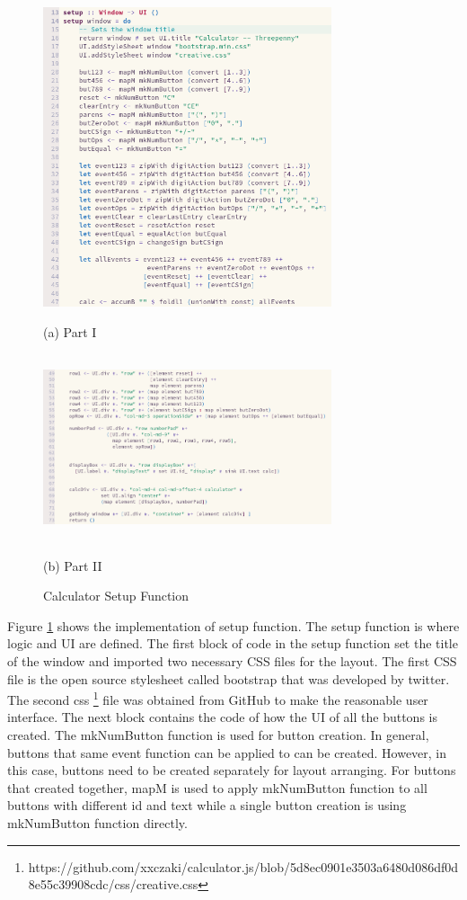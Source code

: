 \documentclass{article}
\begin{document}
\begin{normalsize}
\begin{figure}[H]
    \begin{minipage}[b]{0.48\linewidth}
      \centering
      \centerline{\includegraphics[width=8.5cm]{calcsetup1}}
      \centerline{ (a) Part I}\medskip
    \end{minipage}
    \hfill
    \begin{minipage}[b]{0.48\linewidth}
      \centering
      \centerline{\includegraphics[width=8.5cm,height=5.5cm]{calcsetup2}}
      \centerline{ (b) Part II }\medskip
    \end{minipage}
    \caption{Calculator Setup Function}
    \label{fig:calcsetup}
  \end{figure}

  Figure \ref{fig:calcsetup} shows the implementation of setup function.
  The setup function is where logic and UI are defined. The first block of code in the setup function set the title of the window and imported two necessary CSS files for the layout. The first CSS file is the open source stylesheet called bootstrap that was developed by twitter. The second css \footnote[1]{https://github.com/xxczaki/calculator.js/blob/5d8ec0901e3503a6480d086df0d8e55c39908cdc/css/creative.css} file was obtained from GitHub to make the reasonable user interface. The next block contains the code of how the UI of all the buttons is created. The
  mkNumButton function is used for button creation. In general, buttons that same event function can be applied to can be created. However, in this case, buttons need to be created separately for layout arranging. For buttons that created together, mapM is used to apply mkNumButton function to all buttons with different id and text while a single button creation is using mkNumButton function directly.


\end{normalsize}
\end{document}
